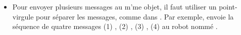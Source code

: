 \documentclass[a4paper,10pt,twoside]{book}
\begin{document}
\begin{itemize}
\item  Pour envoyer plusieurs messages au m'me objet, il faut utiliser un point-virgule pour s\'eparer les messages, comme dans . Par exemple,  envoie la s\'equence de quatre messages (1) , (2) , (3) , (4)  au robot nomm\'e . 
\end{itemize}



\ifx\wholebook\relax\else
    
\end{document}
